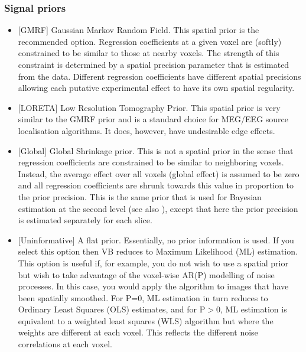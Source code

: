 \subsubsection{Signal priors}
\begin{itemize}

\item{[GMRF] Gaussian Markov Random Field. This spatial prior is the recommended option. Regression coefficients at a given voxel are (softly) constrained to be similar to those at nearby voxels. The strength of this constraint is determined by a spatial precision parameter that is estimated from the data. Different regression coefficients have different spatial precisions allowing each putative experimental effect to have its own spatial regularity. }

                                                                                                            

\item{[LORETA] Low Resolution Tomography Prior. This spatial prior is very similar to the GMRF prior and is a standard choice for MEG/EEG source localisation algorithms. It does, however, have undesirable edge effects.}

                                                                                                            

\item{[Global] Global Shrinkage prior. This is not a spatial prior in the sense that regression coefficients are constrained to be similar to neighboring voxels. Instead, the average effect over all voxels (global effect) is assumed to be zero and all regression coefficients are shrunk towards this value in proportion to the prior precision. This is the same prior that is used for Bayesian estimation at the second level 
(see also \cite{karl_posterior}), except that here the prior precision is estimated separately for each slice. }

                                                                                                            

\item{[Uninformative] A flat prior. Essentially, no prior information is used. If you select this option then VB reduces to Maximum Likelihood (ML) estimation. This option is useful if, for example, you do not wish to use a spatial prior but wish to take advantage of the voxel-wise AR(P) modelling of noise processes. In this case, you would apply the algorithm to images that have been spatially smoothed. For P=0, ML estimation in turn reduces to Ordinary Least Squares (OLS) estimates, and for P$>$0, ML estimation is equivalent to a weighted least squares (WLS) algorithm but where the weights are different at each voxel. This reflects the different noise correlations at each voxel. }

\end{itemize}

